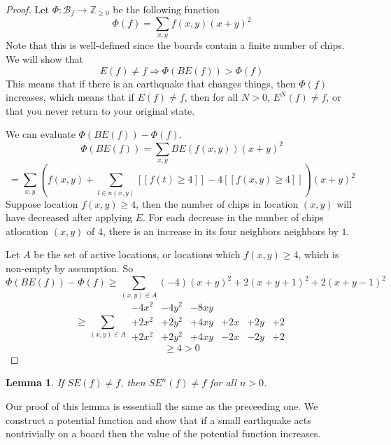 \documentclass[11pt]{article}
\newtheorem{lemma}{Lemma}
\begin{document}
\begin{proof}
Let $\Phi: \mathcal{B}_f \rightarrow \mathbb{Z}_{\geq 0}$ be the following function
\[ \Phi(f) = \sum_{x,y} f(x,y)(x+y)^2 \]
Note that this is well-defined since the boards contain a finite number of chips. We will show that 
\[ E(f) \neq f \Rightarrow \Phi(BE(f)) > \Phi(f) \]
This means that if there is an earthquake that changes things, then $\Phi(f)$ increases, which means that if $E(f) \neq f$, then for all $N > 0$, $E^N(f) \neq f$, or that you never return to your original state.

We can evaluate $\Phi(BE(f)) - \Phi(f)$.
\[ \Phi(BE(f)) = \sum_{x,y} BE(f(x,y)) (x+y)^2 \]
\[ = \sum_{x,y} \left(f(x,y) + \sum_{l \in n(x,y)} [[f(t) \geq 4]] - 4[[f(x,y) \geq 4]]\right) (x+y)^2 \]
Suppose location $f(x,y) \geq 4$, then the number of chips in location $(x,y)$ will have decreased after applying $E$. For each decrease in the number of chips atlocation $(x,y)$ of $4$, there is an increase in its four neighbors neighbors by $1$. 

Let $A$ be the set of active locations, or locations which $f(x,y) \geq 4$, which is non-empty by assumption. 
So
\[ \Phi(BE(f)) - \Phi(f) \geq \sum_{(x,y) \in A} (-4)(x+y)^2 + 2(x+y+1)^2 + 2(x+y-1)^2 \]
\[ \geq \sum_{(x,y) \in A} \begin{array}{cccccc} -4x^2 & -4y^2 & -8xy & & &\\
									   +2x^2 & +2y^2 & +4xy & +2x& +2y &+ 2\\
									   +2x^2 & +2y^2 & +4xy & -2x& -2y  & +2 \end{array} \]
\[ \geq 4 > 0 \] 
\end{proof}

\begin{lemma}
If $SE(f) \neq f$, then $SE^n(f) \neq f$ for all $n > 0$.
\end{lemma}
Our proof of this lemma is essentiall the same as the preceeding one. We construct a potential function and show that if a small earthquake acts nontrivially on a board then the value of the potential function increases. 
\end{document}
